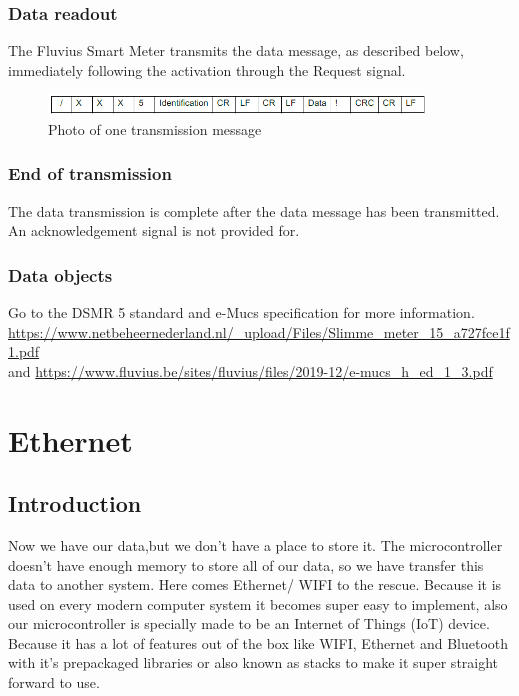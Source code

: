 \documentclass[a4paper,twoside, 12pt]{report}
\theoremstyle{break}
\begin{document}
\subsubsection{Data readout}
The Fluvius Smart Meter transmits the data message, as described below, immediately following the activation through the Request signal.

\begin{figure}[!ht]
  \centering
  \includegraphics[width=10cm]{CommunicationExample.png}
  \qquad
  \caption{Photo of one transmission message}
\end{figure}

\subsubsection{End of transmission}
The data transmission is complete after the data message has been transmitted. An acknowledgement signal is not provided for.

\subsubsection{Data objects}

Go to the DSMR 5 standard and e-Mucs specification for more information.
\url{https://www.netbeheernederland.nl/_upload/Files/Slimme_meter_15_a727fce1f1.pdf}\\
and \url{https://www.fluvius.be/sites/fluvius/files/2019-12/e-mucs_h_ed_1_3.pdf}
\vfill
\eject

\section{Ethernet}
\subsection{Introduction}
Now we have our data,but we don't have a place to store it. The microcontroller doesn't have enough memory to store all of our data, so we have transfer this data to another system.
Here comes Ethernet/ WIFI to the rescue. Because it is used on every modern computer system it becomes super easy to implement, also our microcontroller is specially made to be an Internet of Things (IoT) device. Because it has a lot of features out of the box like WIFI, Ethernet and Bluetooth with it's prepackaged libraries or also known as stacks to make it super straight forward to use.
\end{document}
